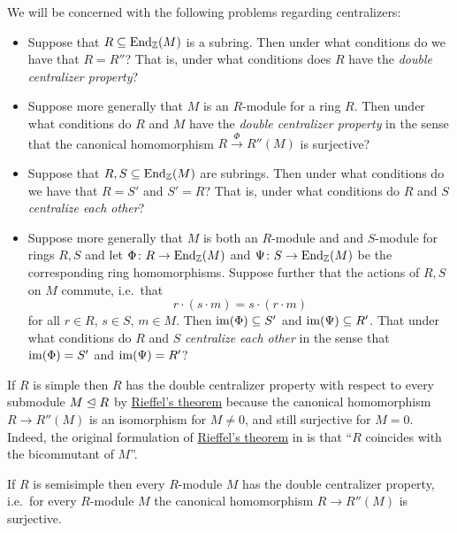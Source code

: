 \begin{fluff}
  We will be concerned with the following problems regarding centralizers:
  \begin{itemize}
    \item
      Suppose that $R \subseteq \operatorname{End}_{\mathbb{Z}}(M)$ is a subring.
      Then under what conditions do we have that $R = R''$?
      That is, under what conditions does $R$ have the \emph{double centralizer property}?
    \item
      Suppose more generally that $M$ is an $R$-module for a ring $R$.
      Then under what conditions do $R$ and $M$ have the \emph{double centralizer property} in the sense that the canonical homomorphism $R \xrightarrow{\Phi} R''(M)$ is surjective?
    \item
      Suppose that $R, S \subseteq \operatorname{End}_{\mathbb{Z}}(M)$ are subrings.
      Then under what conditions do we have that $R = S'$ and $S' = R$?
      That is, under what conditions do $R$ and $S$ \emph{centralize each other}?
    \item
      Suppose more generally that $M$ is both an $R$-module and and $S$-module for rings $R, S$ and let $\Phi \colon R \to \operatorname{End}_{\mathbb{Z}}(M)$ and $\Psi \colon S \to \operatorname{End}_{\mathbb{Z}}(M)$ be the corresponding ring homomorphisms.
      Suppose further that the actions of $R, S$ on $M$ commute, i.e.\ that
      \[
          r \cdot (s \cdot m)
        = s \cdot (r \cdot m)
      \]
      for all $r \in R$, $s \in S$, $m \in M$.
      Then $\operatorname{im}(\Phi) \subseteq S'$ and $\operatorname{im}(\Psi) \subseteq R'$.
      That under what conditions do $R$ and $S$ \emph{centralize each other} in the sense that $\operatorname{im}(\Phi) = S'$ and $\operatorname{im}(\Psi) = R'$?
  \end{itemize}
\end{fluff}


\begin{example}
  If $R$ is simple then $R$ has the double centralizer property with respect to every submodule $M \trianglelefteq R$ by \hyperref[lemma: rieffels theorem]{Rieffel’s theorem} because the canonical homomorphism $R \to R''(M)$ is an isomorphism for $M \neq 0$, and still surjective for $M = 0$.
  Indeed, the original formulation of \hyperref[lemma: rieffels theorem]{Rieffel’s theorem} in \cite{Rieffel} is that \enquote{$R$ coincides with the bicommutant of $M$}.
\end{example}


\begin{proposition}
  \label{proposition: semisimple rings are balanced}
  If $R$ is semisimple then every $R$-module $M$ has the double centralizer property, i.e.\ for every $R$-module $M$ the canonical homomorphism $R \to R''(M)$ is surjective.
\end{proposition}



